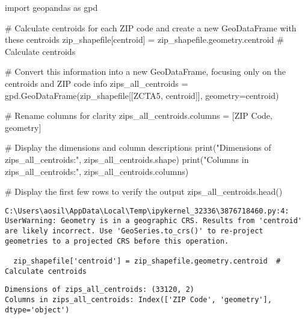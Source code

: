 \documentclass[
  letterpaper,
  DIV=11,
  numbers=noendperiod]{scrartcl}
\newenvironment{Shaded}{\begin{snugshade}}{\end{snugshade}}
\newcommand{\BuiltInTok}[1]{\textcolor[rgb]{0.00,0.23,0.31}{#1}}
\newcommand{\CommentTok}[1]{\textcolor[rgb]{0.37,0.37,0.37}{#1}}
\newcommand{\ImportTok}[1]{\textcolor[rgb]{0.00,0.46,0.62}{#1}}
\newcommand{\NormalTok}[1]{\textcolor[rgb]{0.00,0.23,0.31}{#1}}
\newcommand{\OperatorTok}[1]{\textcolor[rgb]{0.37,0.37,0.37}{#1}}
\newcommand{\StringTok}[1]{\textcolor[rgb]{0.13,0.47,0.30}{#1}}
\begin{document}
\begin{Shaded}
\begin{Highlighting}[]
\ImportTok{import}\NormalTok{ geopandas }\ImportTok{as}\NormalTok{ gpd}

\CommentTok{\# Calculate centroids for each ZIP code and create a new GeoDataFrame with these centroids}
\NormalTok{zip\_shapefile[}\StringTok{\textquotesingle{}centroid\textquotesingle{}}\NormalTok{] }\OperatorTok{=}\NormalTok{ zip\_shapefile.geometry.centroid  }\CommentTok{\# Calculate centroids}

\CommentTok{\# Convert this information into a new GeoDataFrame, focusing only on the centroids and ZIP code info}
\NormalTok{zips\_all\_centroids }\OperatorTok{=}\NormalTok{ gpd.GeoDataFrame(zip\_shapefile[[}\StringTok{\textquotesingle{}ZCTA5\textquotesingle{}}\NormalTok{, }\StringTok{\textquotesingle{}centroid\textquotesingle{}}\NormalTok{]], geometry}\OperatorTok{=}\StringTok{\textquotesingle{}centroid\textquotesingle{}}\NormalTok{)}

\CommentTok{\# Rename columns for clarity}
\NormalTok{zips\_all\_centroids.columns }\OperatorTok{=}\NormalTok{ [}\StringTok{\textquotesingle{}ZIP Code\textquotesingle{}}\NormalTok{, }\StringTok{\textquotesingle{}geometry\textquotesingle{}}\NormalTok{]}

\CommentTok{\# Display the dimensions and column descriptions}
\BuiltInTok{print}\NormalTok{(}\StringTok{"Dimensions of zips\_all\_centroids:"}\NormalTok{, zips\_all\_centroids.shape)}
\BuiltInTok{print}\NormalTok{(}\StringTok{"Columns in zips\_all\_centroids:"}\NormalTok{, zips\_all\_centroids.columns)}

\CommentTok{\# Display the first few rows to verify the output}
\NormalTok{zips\_all\_centroids.head()}
\end{Highlighting}
\end{Shaded}

\begin{verbatim}
C:\Users\aosil\AppData\Local\Temp\ipykernel_32336\3876718460.py:4: UserWarning: Geometry is in a geographic CRS. Results from 'centroid' are likely incorrect. Use 'GeoSeries.to_crs()' to re-project geometries to a projected CRS before this operation.

  zip_shapefile['centroid'] = zip_shapefile.geometry.centroid  # Calculate centroids
\end{verbatim}

\begin{verbatim}
Dimensions of zips_all_centroids: (33120, 2)
Columns in zips_all_centroids: Index(['ZIP Code', 'geometry'], dtype='object')
\end{verbatim}
\end{document}
